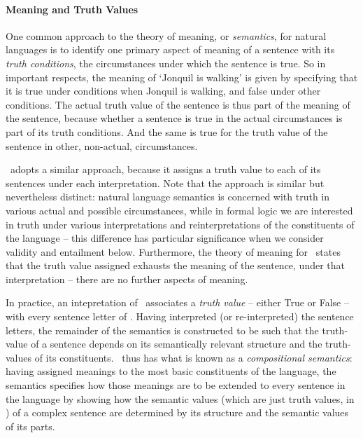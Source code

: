 \paragraph{Meaning and Truth Values} 

One common approach to the theory of meaning, or \emph{semantics}, for natural languages is to identify one primary aspect of meaning of a sentence with its \emph{truth conditions}, the circumstances under which the sentence is true. So in important respects, the meaning of `Jonquil is walking' is given by specifying that it is true under conditions when Jonquil is walking, and false under other conditions. The actual truth value of the sentence is thus part of the meaning of the sentence, because whether a sentence is true in the actual circumstances is part of its truth conditions. And the same is true for the truth value of the sentence in other, non-actual, circumstances.

\lone\ adopts a similar approach, because it assigns a truth value to each of its sentences under each interpretation. Note that the approach is similar but nevertheless distinct: natural language semantics is concerned with truth in various actual and possible circumstances, while in formal logic we are interested in truth under various interpretations and reinterpretations of the constituents of the language – this difference has particular significance when we consider validity and entailment below.
 Furthermore, the theory of meaning for \lone\ states that the truth value assigned exhausts the meaning of the sentence, under that interpretation – there are no further aspects of meaning.

In practice, an intepretation of \lone\ associates a \emph{truth value} – either True or False – with  every sentence letter of \lone. Having interpreted (or re-interpreted) the sentence letters, the remainder of the semantics is constructed to be such that the truth-value of a sentence depends on its semantically relevant structure and the truth-values of its constituents. \lone\ thus has what is known as a \emph{compositional semantics}: having assigned meanings to the most basic constituents of the language, the semantics specifies how those meanings are to be extended to every sentence in the language by showing how the semantic values (which are just truth values, in \lone) of a complex sentence are determined by its structure and the semantic values of its parts. 


